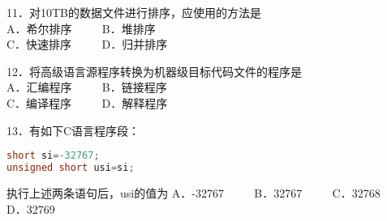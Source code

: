 11．对10TB的数据文件进行排序，应使用的方法是 \\
A．希尔排序 $\qquad$ B．堆排序 \\
C．快速排序 $\qquad$ D．归并排序

12．将高级语言源程序转换为机器级目标代码文件的程序是 \\
A．汇编程序 $\qquad$ B．链接程序 \\
C．编译程序 $\qquad$ D．解释程序

13．有如下C语言程序段： \\
\begin{lstlisting}[language=cpp]
short si=-32767;
unsigned short usi=si;
\end{lstlisting}
执行上述两条语句后，usi的值为
A．-32767 $\qquad$ B．32767 $\qquad$ C．32768 $\qquad$ D．32769

